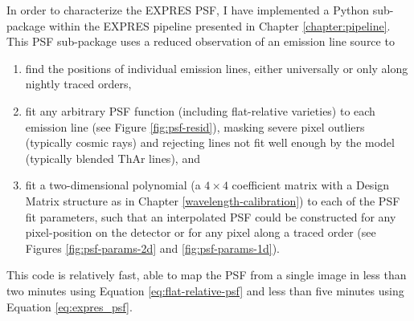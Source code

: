 In order to characterize the EXPRES PSF, I have implemented a Python sub-package within the EXPRES pipeline presented in Chapter \ref{chapter:pipeline}. This PSF sub-package uses a reduced observation of an emission line source to
\begin{enumerate}
    \item find the positions of individual emission lines, either universally or only along nightly traced orders,
    \item fit any arbitrary PSF function (including flat-relative varieties) to each emission line (see Figure \ref{fig:psf-resid}), masking severe pixel outliers (typically cosmic rays) and rejecting lines not fit well enough by the model (typically blended ThAr lines), and
    \item fit a two-dimensional polynomial (a $4 \times 4$ coefficient matrix with a Design Matrix structure as in Chapter \ref{wavelength-calibration}) to each of the PSF fit parameters, such that an interpolated PSF could be constructed for any pixel-position on the detector or for any pixel along a traced order (see Figures \ref{fig:psf-params-2d} and \ref{fig:psf-params-1d}).
\end{enumerate}
This code is relatively fast, able to map the PSF from a single image in less than two minutes using Equation \ref{eq:flat-relative-psf} and less than five minutes using Equation \ref{eq:expres_psf}.

